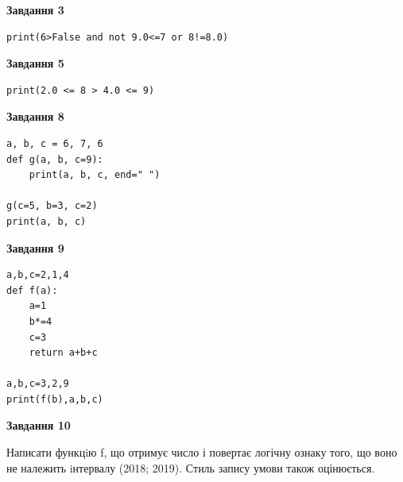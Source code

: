 \documentclass[12pt, ukrainian]{article}
\begin{document}
{\begin {large}
\begin{minipage}[t]{7.5cm}
\end{minipage}
\vline \hspace{6mm}
\begin{minipage}[t]{10.5cm}

\begin{center}
\textbf{Завдання 3}
\end{center}

\begin{verbatim}
print(6>False and not 9.0<=7 or 8!=8.0)
\end{verbatim}



\begin{center}
\textbf{Завдання 5}
\end{center}

\begin{verbatim}
print(2.0 <= 8 > 4.0 <= 9)
\end{verbatim}



\begin{center}
\textbf{Завдання 8}
\end{center}

\begin{verbatim}
a, b, c = 6, 7, 6
def g(a, b, c=9):
    print(a, b, c, end=" ")

g(c=5, b=3, c=2)
print(a, b, c)
\end{verbatim}



\begin{center}
\textbf{Завдання 9}
\end{center}

\begin{verbatim}
a,b,c=2,1,4
def f(a):
    a=1
    b*=4
    c=3
    return a+b+c

a,b,c=3,2,9
print(f(b),a,b,c)
\end{verbatim}



\begin{center}
\textbf{Завдання 10}
\end{center}

Написати функцiю f, що отримує число і повертає логічну ознаку того, що воно не належить iнтервалу (2018; 2019). Стиль запису умови також оцінюється.\par

\end{minipage}

\end {large}}
\newpage
\end{document}
